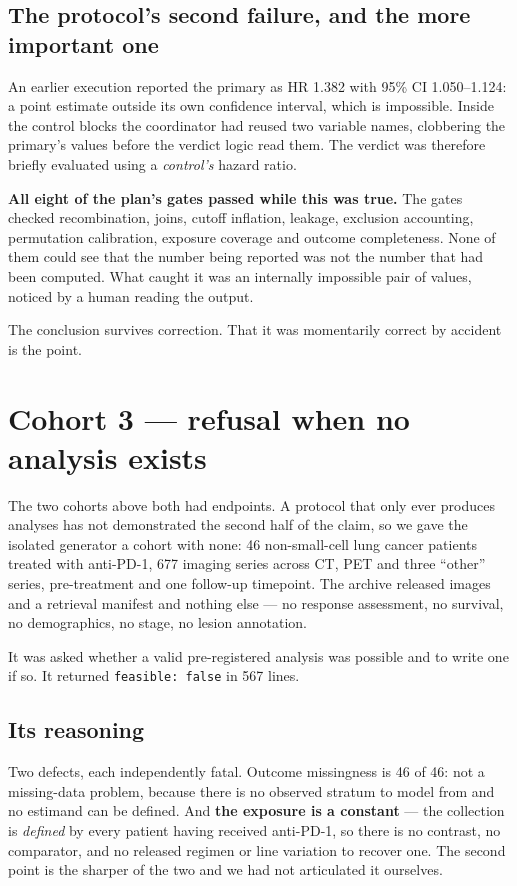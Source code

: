 \documentclass[11pt,a4paper]{article}
\begin{document}
\subsection{The protocol's second failure, and the more important one}

An earlier execution reported the primary as HR 1.382 with 95\% CI 1.050--1.124: a point estimate
outside its own confidence interval, which is impossible. Inside the control blocks the coordinator
had reused two variable names, clobbering the primary's values before the verdict logic read them.
The verdict was therefore briefly evaluated using a \emph{control's} hazard ratio.

\textbf{All eight of the plan's gates passed while this was true.} The gates checked recombination,
joins, cutoff inflation, leakage, exclusion accounting, permutation calibration, exposure coverage
and outcome completeness. None of them could see that the number being reported was not the number
that had been computed. What caught it was an internally impossible pair of values, noticed by a
human reading the output.

The conclusion survives correction. That it was momentarily correct by accident is the point.

\section{Cohort 3 --- refusal when no analysis exists}

The two cohorts above both had endpoints. A protocol that only ever produces analyses has not
demonstrated the second half of the claim, so we gave the isolated generator a cohort with none:
46 non-small-cell lung cancer patients treated with anti-PD-1, 677 imaging series across CT, PET
and three ``other'' series, pre-treatment and one follow-up timepoint. The archive released
images and a retrieval manifest and nothing else --- no response assessment, no survival, no
demographics, no stage, no lesion annotation.

It was asked whether a valid pre-registered analysis was possible and to write one if so. It
returned \texttt{feasible: false} in 567 lines.

\subsection{Its reasoning}

Two defects, each independently fatal. Outcome missingness is 46 of 46: not a missing-data
problem, because there is no observed stratum to model from and no estimand can be defined. And
\textbf{the exposure is a constant} --- the collection is \emph{defined} by every patient having
received anti-PD-1, so there is no contrast, no comparator, and no released regimen or line
variation to recover one. The second point is the sharper of the two and we had not articulated
it ourselves.
\end{document}
